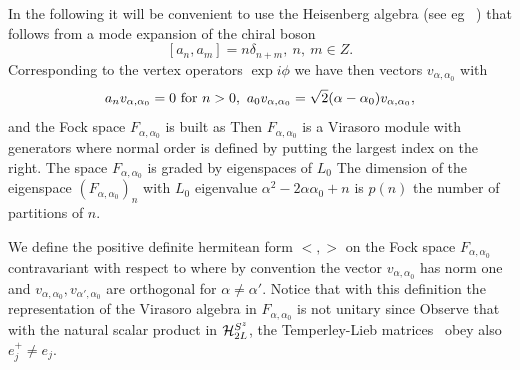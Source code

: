 In the following it will be convenient to use  the Heisenberg algebra (see eg
\KR\ )
that follows from
a mode expansion of the chiral boson
$$
[a_n,a_m]=n\delta_{n+m},\ n,\ m\in Z.
$$
Corresponding to the vertex operators $\exp i\phi$  we have then vectors
$v_{\alpha,\alpha_0}$ with
$$
a_nv_{\alpha,\alpha_0}=0\hbox{ for }n>0,\
a_0v_{\alpha,\alpha_0}=\sqrt{2}(\alpha-\alpha_0)
 v_{\alpha,
\alpha_0},
$$
and the Fock space  $F_{\alpha,\alpha_0}$ is built as
%
\eqn{}
%
Then  $F_{\alpha,\alpha_0}$ is a Virasoro module with generators
%
\eqn{}
%
where normal order is defined by putting the largest index on the right.
The space  $F_{\alpha,\alpha_0}$ is graded by eigenspaces of $L_0$
%
\eqn{}
%
The dimension of the eigenspace $\left(F_{\alpha,\alpha_0}\right)_n$ with $L_0$
eigenvalue
$\alpha^2-2\alpha\alpha_0+n$ is $p(n)$ the number of partitions of $n$.


We define the positive definite  hermitean form  $<,>$
on the Fock space $F_{\alpha,\alpha_0}$ contravariant with respect to
%
\eqn{}
%
where by convention the vector $v_{\alpha,\alpha_0}$ has norm one and
 $v_{\alpha,\alpha_0},v_{\alpha',\alpha_0}$
are orthogonal for $\alpha\neq\alpha'$.
Notice that with this definition the  representation
of the Virasoro algebra in $F_{\alpha,\alpha_0}$ is not unitary since
%
\eqn{}
%
Observe that with the natural scalar product in ${\cal H}_{2L}^{S^z}$, the
Temperley-Lieb matrices \evi\ obey also $e_j^+\neq e_j$.



